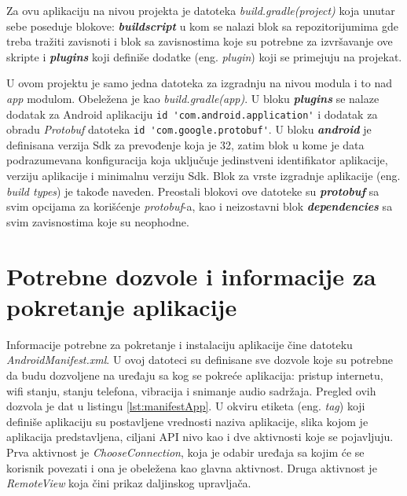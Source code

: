 \documentclass[implementacija.tex]{subfiles}
\begin{document}
Za ovu aplikaciju na nivou projekta je datoteka \textit{build.gradle(project)} koja unutar sebe poseduje blokove: \textbf{\textit{buildscript}} u kom se nalazi blok sa repozitorijumima gde treba tražiti zavisnoti i blok sa zavisnostima koje su potrebne za izvršavanje ove skripte i \textbf{\textit{plugins}} koji definiše dodatke (eng. \textit{plugin}) koji se primejuju na projekat.

U ovom projektu je samo jedna datoteka za izgradnju na nivou modula i to nad \textit{app} modulom. Obeležena je kao \textit{build.gradle(app)}. U bloku \textit{\textbf{plugins}} se nalaze dodatak za Android aplikaciju  \verb|id 'com.android.application'| i dodatak za obradu \textit{Protobuf} datoteka \verb|id 'com.google.protobuf'|. U bloku \textit{\textbf{android}} je definisana verzija Sdk za prevođenje koja je 32, zatim blok u kome je data podrazumevana konfiguracija koja uključuje jedinstveni identifikator aplikacije, verziju aplikacije i minimalnu verziju Sdk. Blok za vrste izgradnje aplikacije (eng. \textit{build types}) je takođe naveden. Preostali blokovi ove datoteke su \textit{\textbf{protobuf}} sa svim opcijama za korišćenje \textit{protobuf}-a, kao i neizostavni blok \textit{\textbf{dependencies}} sa svim zavisnostima koje su neophodne. 

\section{Potrebne dozvole i informacije za pokretanje aplikacije}

Informacije potrebne za pokretanje i instalaciju aplikacije čine datoteku \textit{AndroidManifest.xml}. U ovoj datoteci su definisane sve dozvole koje su potrebne da budu dozvoljene na uređaju sa kog se pokreće aplikacija: pristup internetu, wifi stanju, stanju telefona, vibracija i  snimanje audio sadržaja. Pregled ovih dozvola je dat u listingu \ref{lst:manifestApp}. U okviru etiketa (eng. \textit{tag}) koji definiše aplikaciju su postavljene vrednosti naziva aplikacije, slika kojom je aplikacija predstavljena, ciljani API nivo kao i dve aktivnosti koje se pojavljuju. Prva aktivnost je \textit{ChooseConnection}, koja je odabir uređaja sa kojim će se korisnik povezati i ona je obeležena kao glavna aktivnost. Druga aktivnost je \textit{RemoteView} koja čini prikaz daljinskog upravljača. 


\end{document}
